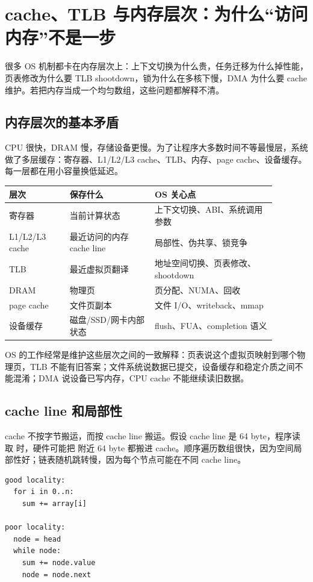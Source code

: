 \section{cache、TLB 与内存层次：为什么“访问内存”不是一步}

很多 OS 机制都卡在内存层次上：上下文切换为什么贵，任务迁移为什么掉性能，页表修改为什么要 TLB shootdown，锁为什么在多核下慢，DMA 为什么要 cache 维护。若把内存当成一个均匀数组，这些问题都解释不清。

\subsection{内存层次的基本矛盾}

CPU 很快，DRAM 慢，存储设备更慢。为了让程序大多数时间不等最慢层，系统做了多层缓存：寄存器、L1/L2/L3 cache、TLB、内存、page cache、设备缓存。每一层都在用小容量换低延迟。

\begin{longtable}{p{0.2\linewidth}p{0.28\linewidth}p{0.4\linewidth}}
\toprule
层次 & 保存什么 & OS 关心点 \\
\midrule
寄存器 & 当前计算状态 & 上下文切换、ABI、系统调用参数 \\
L1/L2/L3 cache & 最近访问的内存 cache line & 局部性、伪共享、锁竞争 \\
TLB & 最近虚拟页翻译 & 地址空间切换、页表修改、shootdown \\
DRAM & 物理页 & 页分配、NUMA、回收 \\
page cache & 文件页副本 & 文件 I/O、writeback、mmap \\
设备缓存 & 磁盘/SSD/网卡内部状态 & flush、FUA、completion 语义 \\
\bottomrule
\end{longtable}

OS 的工作经常是维护这些层次之间的一致解释：页表说这个虚拟页映射到哪个物理页，TLB 不能有旧答案；文件系统说数据已提交，设备缓存和稳定介质之间不能混淆；DMA 说设备已写内存，CPU cache 不能继续读旧数据。

\subsection{cache line 和局部性}

cache 不按字节搬运，而按 cache line 搬运。假设 cache line 是 64 byte，程序读取  时，硬件可能把  附近 64 byte 都搬进 cache。顺序遍历数组很快，因为空间局部性好；链表随机跳转慢，因为每个节点可能在不同 cache line。

\begin{lstlisting}
good locality:
  for i in 0..n:
    sum += array[i]

poor locality:
  node = head
  while node:
    sum += node.value
    node = node.next
\end{lstlisting}

